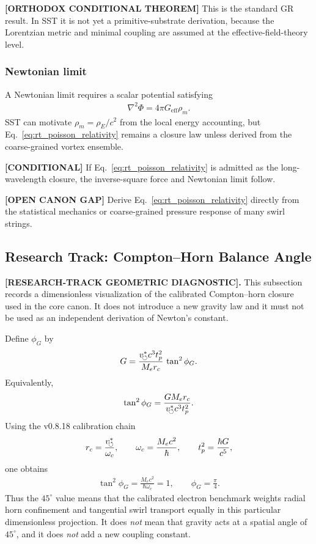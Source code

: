 \textbf{[ORTHODOX CONDITIONAL THEOREM]} This is the standard GR result. In SST
it is not yet a primitive-substrate derivation, because the Lorentzian metric
and minimal coupling are assumed at the effective-field-theory level.

\subsubsection{Newtonian limit}

A Newtonian limit requires a scalar potential satisfying
\begin{align}
    \nabla^2 \Phi
    =
    4\pi G_{\mathrm{eff}}\rho_{\!m}.
    \label{eq:rt_poisson_relativity}
\end{align}
SST can motivate \(\rho_{\!m}=\rho_{\!E}/c^2\) from the local energy accounting,
but Eq.~\eqref{eq:rt_poisson_relativity} remains a closure law unless derived from the
coarse-grained vortex ensemble.

\textbf{[CONDITIONAL]} If Eq.~\eqref{eq:rt_poisson_relativity} is admitted as the
long-wavelength closure, the inverse-square force and Newtonian limit follow.

\textbf{[OPEN CANON GAP]} Derive Eq.~\eqref{eq:rt_poisson_relativity} directly from the
statistical mechanics or coarse-grained pressure response of many swirl strings.

\subsection{Research Track: Compton--Horn Balance Angle}
\label{sec:rt_compton_horn_balance_angle}

\textbf{[RESEARCH-TRACK GEOMETRIC DIAGNOSTIC].}
This subsection records a dimensionless visualization of the calibrated
Compton--horn closure used in the core canon.  It does not introduce a new
gravity law and it must not be used as an independent derivation of
Newton's constant.

Define \(\phi_G\) by
\begin{align}
    G
    =
    \frac{v_{\!\boldsymbol{\circlearrowleft}}^{\ast} c^3t_p^2}{M_er_c}\,\tan^2\phi_G .
    \label{eq:rt_balance_angle_definition}
\end{align}
Equivalently,
\begin{align}
    \tan^2\phi_G
    =
    \frac{GM_er_c}{v_{\!\boldsymbol{\circlearrowleft}}^{\ast} c^3t_p^2}.
    \label{eq:rt_balance_angle_value}
\end{align}
Using the v0.8.18 calibration chain
\begin{align}
    r_c=\frac{v_{\!\boldsymbol{\circlearrowleft}}^{\ast}}{\omega_c},
    \qquad
    \omega_c=\frac{M_ec^2}{\hbar},
    \qquad
    t_p^2=\frac{\hbar G}{c^5},
\end{align}
one obtains
\begin{align}
    \tan^2\phi_G
    =
    \frac{M_ec^2}{\hbar\omega_c}
    =1,
    \qquad
    \phi_G=\frac{\pi}{4}.
    \label{eq:rt_balance_angle_pi_over_four}
\end{align}
Thus the \(45^\circ\) value means that the calibrated electron benchmark
weights radial horn confinement and tangential swirl transport equally in this
particular dimensionless projection.  It does \emph{not} mean that gravity acts
at a spatial angle of \(45^\circ\), and it does \emph{not} add a new coupling
constant.

